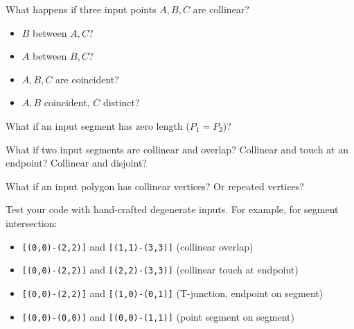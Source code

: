 \begin{debugchecklist}
\label{debug:A.3.4.degenerate_checklist}
    \item What happens if three input points $A, B, C$ are collinear?
        \begin{itemize}
            \item $B$ between $A, C$?
            \item $A$ between $B, C$?
            \item $A, B, C$ are coincident?
            \item $A, B$ coincident, $C$ distinct?
        \end{itemize}
    \item What if an input segment has zero length ($P_1=P_2$)?
    \item What if two input segments are collinear and overlap? Collinear and touch at an endpoint? Collinear and disjoint?
    \item What if an input polygon has collinear vertices? Or repeated vertices?
    \item Test your code with hand-crafted degenerate inputs. For example, for segment intersection:
        \begin{itemize}
            \item \texttt{[(0,0)-(2,2)]} and \texttt{[(1,1)-(3,3)]} (collinear overlap)
            \item \texttt{[(0,0)-(2,2)]} and \texttt{[(2,2)-(3,3)]} (collinear touch at endpoint)
            \item \texttt{[(0,0)-(2,2)]} and \texttt{[(1,0)-(0,1)]} (T-junction, endpoint on segment)
            \item \texttt{[(0,0)-(0,0)]} and \texttt{[(0,0)-(1,1)]} (point segment on segment)
        \end{itemize}
\end{debugchecklist}